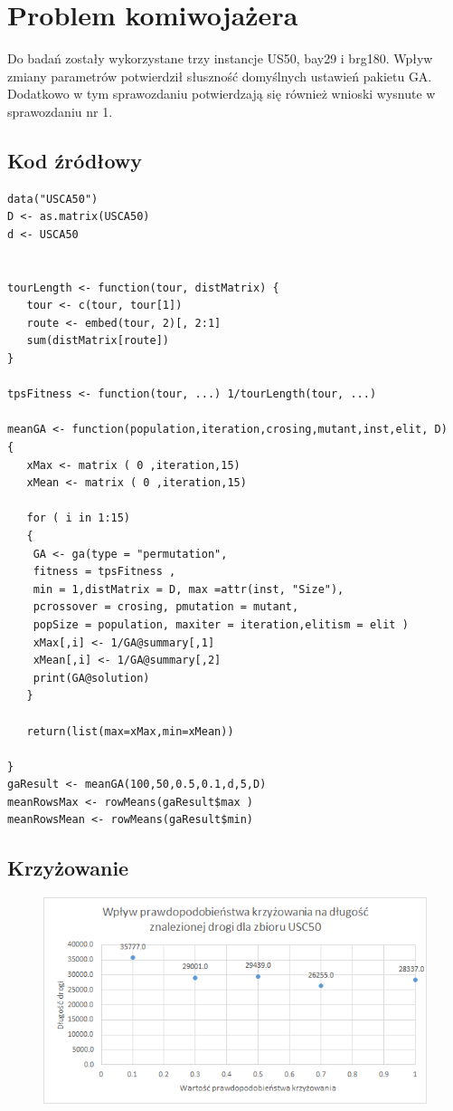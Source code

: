 \section{Problem komiwojażera}

Do badań zostały wykorzystane trzy instancje US50, bay29 i brg180. Wpływ zmiany parametrów potwierdził słuszność domyślnych ustawień pakietu GA. Dodatkowo w tym sprawozdaniu potwierdzają się również wnioski wysnute w sprawozdaniu nr 1.


\subsection{Kod źródłowy}

\begin{lstlisting}[linewidth=15.4cm]
data("USCA50")
D <- as.matrix(USCA50)
d <- USCA50


tourLength <- function(tour, distMatrix) {
   tour <- c(tour, tour[1])
   route <- embed(tour, 2)[, 2:1]
   sum(distMatrix[route])
}

tpsFitness <- function(tour, ...) 1/tourLength(tour, ...)

meanGA <- function(population,iteration,crosing,mutant,inst,elit, D)
{
   xMax <- matrix ( 0 ,iteration,15)   
   xMean <- matrix ( 0 ,iteration,15)  

   for ( i in 1:15)
   {  
	GA <- ga(type = "permutation",
	fitness = tpsFitness ,
	min = 1,distMatrix = D, max =attr(inst, "Size"), 
	pcrossover = crosing, pmutation = mutant,
	popSize = population, maxiter = iteration,elitism = elit )
	xMax[,i] <- 1/GA@summary[,1]
	xMean[,i] <- 1/GA@summary[,2]
	print(GA@solution)
   }

   return(list(max=xMax,min=xMean))

}
gaResult <- meanGA(100,50,0.5,0.1,d,5,D)
meanRowsMax <- rowMeans(gaResult$max )
meanRowsMean <- rowMeans(gaResult$min)
\end{lstlisting}


\subsection{Krzyżowanie}


\begin{figure}[H]
\centering

\includegraphics[scale=0.9]{IO_obrazy/excel_usca_kros}
\end{figure}


